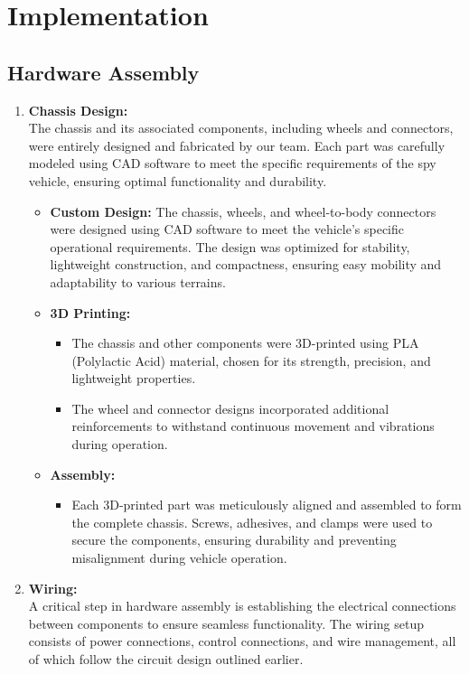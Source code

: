 \documentclass[12pt,a4paper]{report}
\begin{document}
	\section{Implementation}
\label{Hardware Assembly}
\subsection{Hardware Assembly}

\begin{enumerate}
    \item \textbf{Chassis Design:} \\
     The chassis and its associated components, including wheels and connectors, were entirely designed and fabricated by our team. Each part was carefully modeled using CAD software to meet the specific requirements of the spy vehicle, ensuring optimal functionality and durability.
    \begin{itemize}

        \item \textbf{Custom Design:} The chassis, wheels, and wheel-to-body connectors were designed using CAD software to meet the vehicle’s specific operational requirements. The design was optimized for stability, lightweight construction, and compactness, ensuring easy mobility and adaptability to various terrains.
        \item \textbf{3D Printing:} 
        \begin{itemize}
            \item The chassis and other components were 3D-printed using PLA (Polylactic Acid) material, chosen for its strength, precision, and lightweight properties.
            \item The wheel and connector designs incorporated additional reinforcements to withstand continuous movement and vibrations during operation.
        \end{itemize}
        \item \textbf{Assembly:} 
        \begin{itemize}
            \item Each 3D-printed part was meticulously aligned and assembled to form the complete chassis. Screws, adhesives, and clamps were used to secure the components, ensuring durability and preventing misalignment during vehicle operation.
        \end{itemize}
    \end{itemize}
    
    
    \item \textbf{Wiring:} \\
A critical step in hardware assembly is establishing the electrical connections between components to ensure seamless functionality. The wiring setup consists of power connections, control connections, and wire management, all of which follow the circuit design outlined earlier.


\end{enumerate}
\end{document}
